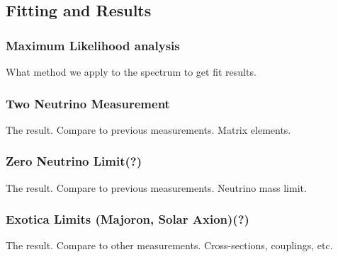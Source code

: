 \documentclass[12pt,letterpaper,onecolumn]{article}
\begin{document}
\subsection{Fitting and Results}

\subsubsection{Maximum Likelihood analysis}
What method we apply to the spectrum to get fit results.

\subsubsection{Two Neutrino Measurement}
The result. Compare to previous measurements. Matrix elements.

\subsubsection{Zero Neutrino Limit(?)}
The result. Compare to previous measurements. Neutrino mass limit.

\subsubsection{Exotica Limits (Majoron, Solar Axion)(?)}
The result. Compare to other measurements. Cross-sections, couplings, etc.

\newpage
\end{document}
